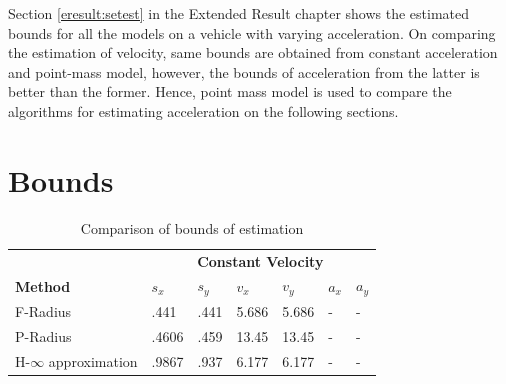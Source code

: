 Section \ref{eresult:setest} in the Extended Result chapter shows the estimated bounds for all the models on a vehicle with varying acceleration. On comparing the estimation of velocity, same bounds are obtained from constant acceleration and point-mass model, however, the bounds of acceleration from the latter is better than the former. Hence, point mass model is used to compare the algorithms for estimating acceleration on the following sections.


\section{Bounds}
\begin{table}[htbp]
\caption{Comparison of bounds of estimation\\}
	\centering
	\renewcommand{\arraystretch}{1.1}
	\small	
	\begin{tabular}{l l l l l l l}
		\toprule 
		& \multicolumn{6}{c}{\textbf{Constant Velocity}}\\
		\textbf{Method} & \textbf{$s_x$} & \textbf{$s_y$} & \textbf{$v_x$} & \textbf{$v_y$} & \textbf{$a_x$} & \textbf{$a_y$}\\ \midrule
		F-Radius & .441 & .441 & 5.686 & 5.686 & - & -\\
		P-Radius & .4606 & .459 & 13.45 & 13.45 & - &	-\\
		H-$\infty$ approximation & .9867 &	.937 &	6.177 & 6.177 & - &-\\
		
		
		
		
%		
		

\end{tabular}
\end{table}
